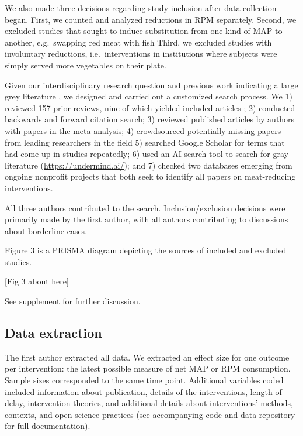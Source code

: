 \documentclass[sn-nature,referee,pdflatex]{sn-jnl}
\begin{document}
We also made three decisions regarding study inclusion after data
collection began. First, we counted and analyzed reductions in RPM
separately. Second, we excluded studies that sought to induce
substitution from one kind of MAP to another, e.g.~swapping red meat
with fish Third, we excluded studies with involuntary reductions,
i.e.~interventions in institutions where subjects were simply served
more vegetables on their plate.

Given our interdisciplinary research question and previous work
indicating a large grey literature \citep{mathur2021meta}, we designed
and carried out a customized search process. We 1) reviewed 157 prior
reviews, nine of which yielded included articles
\citep{mathur2021meta, bianchi2018conscious, bianchi2018restructuring, ammann2023, chang2023, DiGennaro2024, harguess2020, ronto2022, wynes2018};
2) conducted backwards and forward citation search; 3) reviewed
published articles by authors with papers in the meta-analysis; 4)
crowdsourced potentially missing papers from leading researchers in the
field 5) searched Google Scholar for terms that had come up in studies
repeatedly; 6) used an AI search tool to search for gray literature
(\url{https://undermind.ai/}); and 7) checked two databases emerging
from ongoing nonprofit projects that both seek to identify all papers on
meat-reducing interventions.

All three authors contributed to the search. Inclusion/exclusion
decisions were primarily made by the first author, with all authors
contributing to discussions about borderline cases.

Figure 3 is a PRISMA diagram depicting the sources of included and
excluded studies.

\begin{center}
[Fig 3 about here]
\end{center}

See supplement for further discussion.

\subsection{Data extraction}\label{sec3.3}

The first author extracted all data. We extracted an effect size for one
outcome per intervention: the latest possible measure of net MAP or RPM
consumption. Sample sizes corresponded to the same time point.
Additional variables coded included information about publication,
details of the interventions, length of delay, intervention theories,
and additional details about interventions' methods, contexts, and open
science practices (see accompanying code and data repository for full
documentation).
\end{document}
